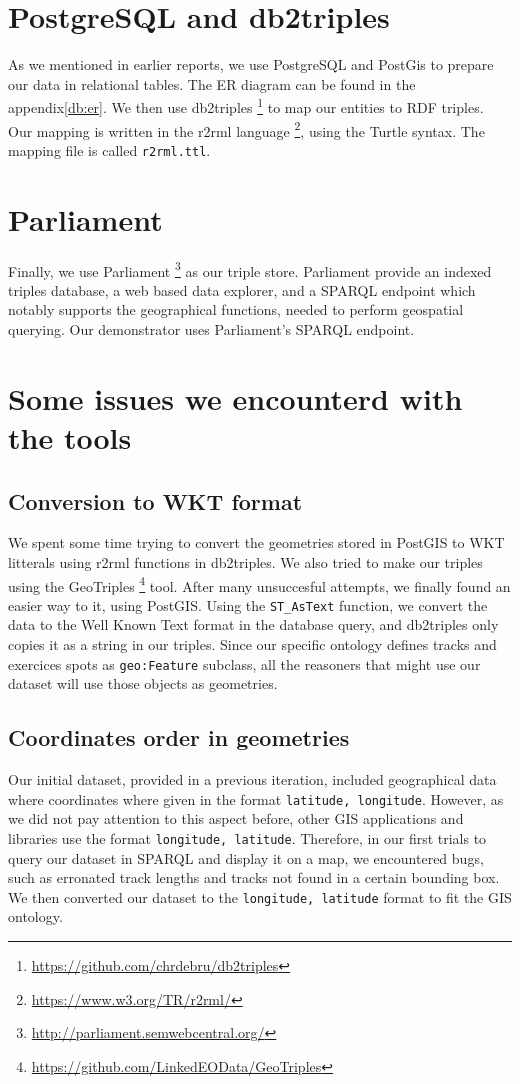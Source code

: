 \documentclass[11pt,a4paper]{scrreprt}
\begin{document}
\section{PostgreSQL and db2triples}
As we mentioned in earlier reports, we use PostgreSQL and PostGis to prepare our data in relational tables. The ER diagram can be found in the appendix\ref{db:er}.  We then use db2triples \footnote{\url{https://github.com/chrdebru/db2triples}} to map our entities to RDF triples. Our mapping is written in the r2rml language \footnote{\url{https://www.w3.org/TR/r2rml/}}, using the Turtle syntax. The mapping file is called \texttt{r2rml.ttl}.

\section{Parliament}
Finally, we use Parliament \footnote{\url{http://parliament.semwebcentral.org/}} as our triple store. Parliament provide an indexed triples database, a web based data explorer, and a SPARQL endpoint which notably supports the geographical functions, needed to perform geospatial querying. Our demonstrator uses Parliament's SPARQL endpoint.

\section{Some issues we encounterd with the tools}
\subsection{Conversion to WKT format}
We spent some time trying to convert the geometries stored in PostGIS to WKT litterals using r2rml functions in db2triples. We also tried to make our triples using the GeoTriples \footnote{\url{https://github.com/LinkedEOData/GeoTriples}} tool. After many unsuccesful attempts, we finally found an easier way to it, using PostGIS. Using the \texttt{ST\_AsText} function, we convert the data to the Well Known Text format in the database query, and db2triples only copies it as a string in our triples. Since our specific ontology defines tracks and exercices spots as \texttt{geo:Feature} subclass, all the reasoners that might use our dataset will use those objects as geometries.

\subsection{Coordinates order in geometries}
Our initial dataset, provided in a previous iteration, included geographical data where coordinates where given in the format \texttt{latitude, longitude}. However, as we did not pay attention to this aspect before, other GIS applications and libraries use the format \texttt{longitude, latitude}. Therefore, in our first trials to query our dataset in SPARQL and display it on a map, we encountered bugs, such as erronated track lengths and tracks not found in a certain bounding box. We then converted our dataset to the \texttt{longitude, latitude} format to fit the GIS ontology.
\end{document}
